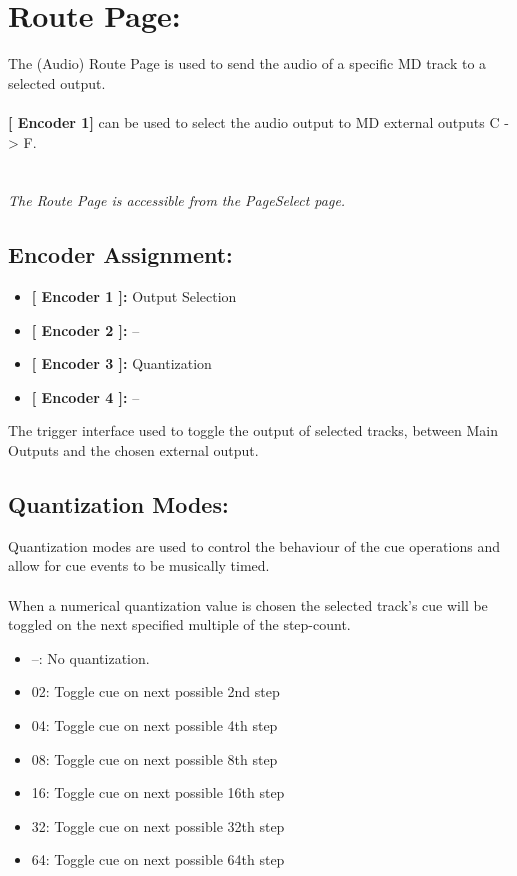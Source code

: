  \chapter{Route Page:}
 The (Audio) Route Page is used to send the audio of a specific MD track to a selected output. \\
 \\\textbf{[ Encoder 1]} can be used to select the audio output to MD external outputs C -> F.\\

\\\\
 \textit{The Route Page is accessible from the PageSelect page.}
  \section{Encoder Assignment:}
 \begin{itemize}
 	\item \textbf{[ Encoder 1 ]: } Output Selection
 	\item \textbf{[ Encoder 2 ]: } --
 	\item \textbf{[ Encoder 3 ]: } Quantization
 	\item \textbf{[ Encoder 4 ]: } --
 \end{itemize}
  The trigger interface used to toggle the output of selected tracks, between Main Outputs and the chosen external output.
 \section{Quantization Modes:}
 Quantization modes are used to control the behaviour of the cue operations and allow for cue events to be musically timed.\\
 \\
 When a numerical quantization value is chosen the selected track’s cue will be toggled on the next specified multiple of the step-count.
 \begin{itemize}
\item --: No quantization.
\item 02: Toggle cue on next possible 2nd step
\item 04: Toggle cue on next possible 4th step
\item 08: Toggle cue on next possible 8th step 
\item 16: Toggle cue on next possible 16th step 
\item 32: Toggle cue on next possible 32th step 
\item 64: Toggle cue on next possible 64th step
 \end{itemize}
 
 